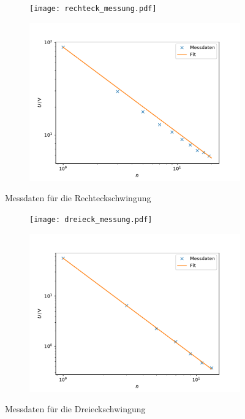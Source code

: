 \begin{figure}[h]
\begin{subfigure}{0.5\textwidth}
    \centering
    \texttt{[image: rechteck\_messung.pdf]}
\end{subfigure}
\begin{subfigure}{0.5\textwidth}
    \centering
    \includegraphics[width=\textwidth]{assets/rechteck_log.pdf}
\end{subfigure}
\caption{Messdaten für die Rechteckschwingung}
\label{fig:rechteck_fit}
\end{figure}

\begin{figure}[h]
\begin{subfigure}{0.5\textwidth}
    \centering
    \texttt{[image: dreieck\_messung.pdf]}
\end{subfigure}
\begin{subfigure}{0.5\textwidth}
    \centering
    \includegraphics[width=\textwidth]{assets/dreieck_log.pdf}
\end{subfigure}
\caption{Messdaten für die Dreieckschwingung}
\label{fig:dreieck_fit}
\end{figure}



